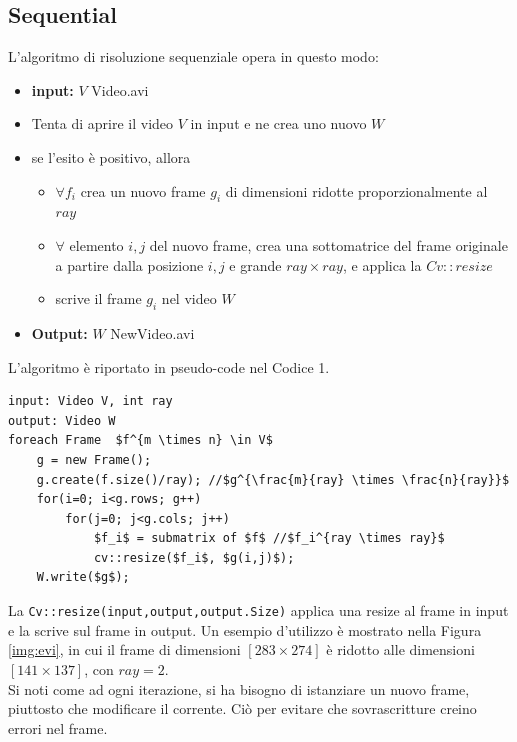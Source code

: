\documentclass[12pt]{article}
\begin{document}
\subsection{Sequential}
L'algoritmo di risoluzione sequenziale opera in questo modo: 
\begin{itemize}
\item \textbf{input:} $V$ Video.avi
\item Tenta di aprire il video $V$ in input e ne crea uno nuovo $W$
\item se l'esito \`e positivo, allora 
\begin{itemize}
\item $\forall f_i$ crea un nuovo frame $g_i$ di dimensioni ridotte proporzionalmente al $ray$
\item $\forall$ elemento $i,j$ del nuovo frame, crea una sottomatrice del frame originale a partire dalla posizione $i,j$ e grande $ray \times ray$, e applica la $Cv::resize$
\item scrive il frame $g_i$ nel video $W$
\end{itemize}
\item \textbf{Output:} $W$ NewVideo.avi
\end{itemize}

L'algoritmo \`e riportato in pseudo-code nel Codice 1.
\begin{lstlisting}[backgroundcolor=\color{White}, caption={Pseudo-code Sequential}, mathescape=true] 
input: Video V, int ray
output: Video W
foreach Frame  $f^{m \times n} \in V$
 	g = new Frame();
 	g.create(f.size()/ray); //$g^{\frac{m}{ray} \times \frac{n}{ray}}$
    for(i=0; i<g.rows; g++)
    	for(j=0; j<g.cols; j++)
    		$f_i$ = submatrix of $f$ //$f_i^{ray \times ray}$
    		cv::resize($f_i$, $g(i,j)$);
    W.write($g$);  
\end{lstlisting}
La \texttt{Cv::resize(input,output,output.Size)} applica una resize al frame in input e la scrive sul frame in output. Un esempio d'utilizzo \`e mostrato nella Figura \ref{img:evi}, in cui il frame di dimensioni $[283 \times 274]$ \`e ridotto alle dimensioni $[141 \times 137]$, con $ray=2$.
\\Si noti come ad ogni iterazione, si ha bisogno di istanziare un nuovo frame, piuttosto che modificare il corrente. Ci\`o per evitare che sovrascritture creino errori nel frame.
\end{document}
